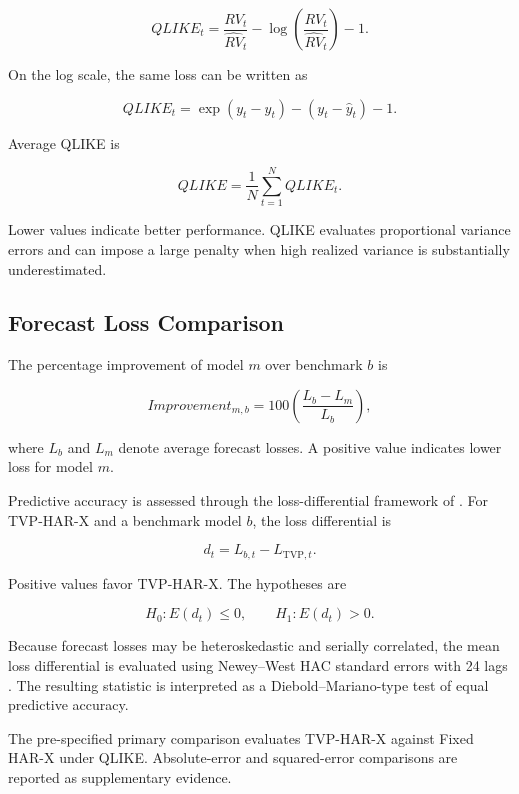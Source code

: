 \begin{equation}
QLIKE_t
=
\frac{RV_t}{\widehat{RV}_t}
-
\log
\left(
\frac{RV_t}{\widehat{RV}_t}
\right)
-1.
\label{eq:qlike-original}
\end{equation}

On the log scale, the same loss can be written as

\begin{equation}
QLIKE_t
=
\exp
\left(
y_t-\widehat{y}_t
\right)
-
\left(
y_t-\widehat{y}_t
\right)
-1.
\label{eq:qlike-log}
\end{equation}

Average QLIKE is

\begin{equation}
QLIKE
=
\frac{1}{N}
\sum_{t=1}^{N}
QLIKE_t.
\label{eq:average-qlike}
\end{equation}

Lower values indicate better performance. QLIKE evaluates
proportional variance errors and can impose a large penalty
when high realized variance is substantially underestimated.

\subsection{Forecast Loss Comparison}

The percentage improvement of model \(m\) over benchmark \(b\)
is

\begin{equation}
Improvement_{m,b}
=
100
\left(
\frac{
L_b-L_m
}{
L_b
}
\right),
\label{eq:percentage-improvement}
\end{equation}

where \(L_b\) and \(L_m\) denote average forecast losses. A
positive value indicates lower loss for model \(m\).

Predictive accuracy is assessed through the loss-differential
framework of \citet{dieboldmariano1995}. For TVP-HAR-X and a
benchmark model \(b\), the loss differential is

\begin{equation}
d_t
=
L_{b,t}
-
L_{\mathrm{TVP},t}.
\label{eq:loss-differential}
\end{equation}

Positive values favor TVP-HAR-X. The hypotheses are

\[
H_0:
E(d_t)\leq 0,
\qquad
H_1:
E(d_t)>0.
\]

Because forecast losses may be heteroskedastic and serially
correlated, the mean loss differential is evaluated using
Newey--West HAC standard errors with 24 lags
\citep{neweywest1987}. The resulting statistic is interpreted
as a Diebold--Mariano-type test of equal predictive accuracy.

The pre-specified primary comparison evaluates TVP-HAR-X
against Fixed HAR-X under QLIKE. Absolute-error and
squared-error comparisons are reported as supplementary
evidence.